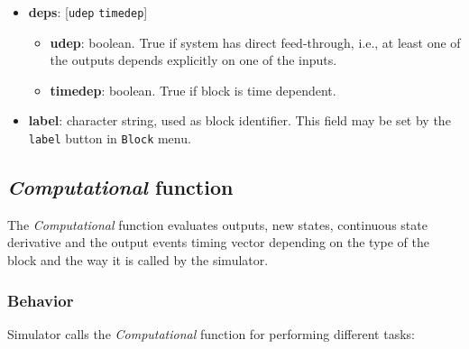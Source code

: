 \documentclass{article}
\newcommand{\computational}{{\em Computational }}
\begin{document}
\begin{itemize}
\item \textbf{deps}: [{\tt udep} {\tt timedep}] 
  \begin{itemize}
  \item \textbf{udep}: boolean. True if system has direct feed-through, i.e., at least
one of the outputs depends explicitly on one of the inputs.
  \item \textbf{timedep}: boolean. True if block is time dependent.
  \end{itemize}
\item \textbf{label}: character string, used as block identifier. This field
  may be set by the {\tt label} button in {\tt Block} menu.
\end{itemize}


\subsection{\computational function}
The \computational function  evaluates outputs, new states,
continuous state derivative and the output events timing vector
depending on the type of the block and the way it is called by the
simulator. 

\subsubsection{Behavior}
\label{tasks}
Simulator calls the \computational function for performing 
different tasks:
\end{document}
